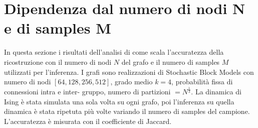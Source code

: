 \documentclass{article}
\begin{document}
\section{Dipendenza dal numero di nodi N e di samples M}
In questa sezione i risultati dell'analisi di come scala l'accuratezza della ricostruzione con il numero di nodi $N$ del grafo e il numero di samples $M$ utilizzati per l'inferenza. I grafi sono realizzazioni di Stochastic Block Models con numero di nodi $[64, 128, 256, 512]$, grado medio $k = 4$, probabilità fissa di connessioni intra e inter- gruppo, numero di partizioni $= N^{\frac{1}{3}}$. La dinamica di Ising è stata simulata una sola volta su ogni grafo, poi l'inferenza su quella dinamica è stata ripetuta più volte variando il numero di samples del campione. L'accuratezza è misurata con il coefficiente di Jaccard.
\end{document}
